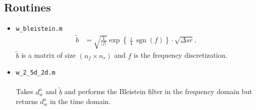 \documentclass[a4paper,12pt]{article}
\begin{document}
\subsection*{Routines}
\begin{itemize}
\item \color{boiseBlue}\texttt{w\_bleistein.m}\color{black}
\begin{align*}
\tilde{b} &= \sqrt{ \frac{1}{|f|} }
\exp\left\{{\frac{\imath}{4} \operatorname{sgn} (f)}\right\} \cdot \sqrt{\Delta sr}.
\end{align*}
$\tilde{b}$ is a matrix of size $(n_f\times n_r)$ and $f$ is the frequency discretization.
\item \color{boiseBlue}\texttt{w\_2\_5d\_2d.m}\color{black}
\\\\
Takes $d_w^o$ and $\tilde{b}$ and performs the Bleistein filter in the frequency domain but returns $d_w^o$ in the time domain.
\end{itemize}
\end{document}
